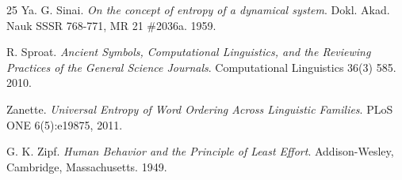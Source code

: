 \begin{thebibliography}{25}
Ya. G. Sinai. \emph{On the concept of entropy of a dynamical system}. Dokl. Akad. Nauk SSSR 768-771, MR 21 \#2036a. 1959.

R. Sproat. \emph{Ancient Symbols, Computational Linguistics, and the Reviewing Practices of the General Science Journals}. Computational Linguistics 36(3) 585. 2010.

Zanette. \emph{Universal Entropy of Word Ordering Across Linguistic Families}. PLoS ONE 6(5):e19875, 2011.

G. K. Zipf. \emph{Human Behavior and the Principle of Least Effort}. Addison-Wesley, Cambridge, Massachusetts. 1949.

\end{thebibliography}
